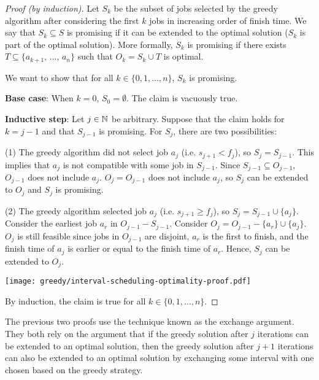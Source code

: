 \begin{proof}[Proof (by induction)]
    Let $S_k$ be the subset of jobs selected by the greedy algorithm after considering the first $k$ jobs in increasing order of finish time. We say that $S_k \subseteq S$ is promising if it can be extended to the optimal solution ($S_k$ is part of the optimal solution). More formally, $S_k$ is promising if there exists $T \subseteq \{ a_{k+1},\, \ldots,\, a_{n}\}$ such that $O_k = S_k \cup T$ is optimal.

    We want to show that for all $k \in \{0,1,\ldots,n\}$, $S_k$ is promising.

    \textbf{Base case}: When $k=0$, $S_0=\emptyset$. The claim is vacuously true.
    
    \textbf{Inductive step}: Let $j \in \mathbb{N}$ be arbitrary. Suppose that the claim holds for $k = j - 1$ and that $S_{j-1}$ is promising. For $S_j$, there are two possibilities:

    (1) The greedy algorithm did not select job $a_j$ (i.e. $s_{j+1} < f_j$), so $S_j = S_{j-1}$. This implies that $a_j$ is not compatible with some job in $S_{j-1}$. Since $S_{j-1} \subseteq O_{j-1}$, $O_{j-1}$ does not include $a_j$. $O_j = O_{j-1}$ does not include $a_j$, so $S_j$ can be extended to $O_j$ and $S_j$ is promising.
    
    (2) The greedy algorithm selected job $a_j$ (i.e. $s_{j+1} \geq f_j$), so $S_j = S_{j-1} \cup \{a_j\}$. Consider the earliest job $a_r$ in $O_{j-1} - S_{j-1}$. Consider $O_j = O_{j-1} - \{a_r\} \cup \{a_j\}$. $O_j$ is still feasible since jobs in $O_{j-1}$ are disjoint, $a_r$ is the first to finish, and the finish time of $a_j$ is earlier or equal to the finish time of $a_r$. Hence, $S_j$ can be extended to $O_j$.

    \begin{center}
        \texttt{[image: greedy/interval-scheduling-optimality-proof.pdf]}
    \end{center}
    By induction, the claim is true for all $k \in \{0,1,\ldots,n\}$.
\end{proof}

The previous two proofs use the technique known as the exchange argument. They both rely on the argument that if the greedy solution after $j$ iterations can be extended to an optimal solution, then the greedy solution after $j+1$ iterations can also be extended to an optimal solution by exchanging some interval with one chosen based on the greedy strategy. 

